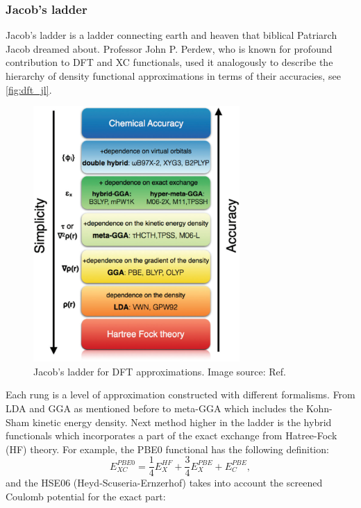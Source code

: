 \subsubsection{Jacob's ladder}
Jacob's ladder is a ladder connecting earth and heaven that biblical Patriarch Jacob dreamed about. Professor John P. Perdew, who is known for profound contribution to DFT and XC functionals, used it analogously to describe the hierarchy of density functional approximations in terms of their accuracies, see \autoref{fig:dft_jl}.  
\begin{figure}[htbp!] 
\centering  
\includegraphics[width=0.7\textwidth]{jacobs.png}
\caption[Jacob's ladder for DFT approximations]{ Jacob's ladder for DFT approximations. Image source: Ref. \cite{Peng2016}}  
\label{fig:dft_jl}
\end{figure} 
Each rung is a level of approximation constructed with different formalisms. From LDA and GGA as mentioned before to meta-GGA which includes the Kohn-Sham kinetic energy density. Next method higher in the ladder is the hybrid functionals which incorporates a part of the exact exchange from Hatree-Fock (HF) theory. For example, the PBE0 functional\cite{Carlo1999} has the following definition:
\begin{equation}
E_{XC}^{PBE0}=\frac{1}{4}E_X^{HF}+\frac{3}{4}E_X^{PBE}+E_C^{PBE},
\end{equation}
and the HSE06 (Heyd-Scuseria-Ernzerhof)\cite{Jochen2003} takes into account the screened Coulomb potential for the exact part:
